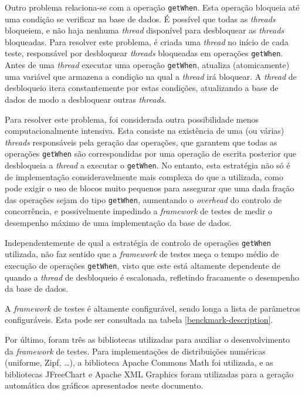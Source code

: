 \documentclass[12pt, a4paper, titlepage]{article}
\begin{document}
Outro problema relaciona-se com a operação \texttt{getWhen}. Esta operação bloqueia até uma condição
se verificar na base de dados. É possível que todas as \emph{threads} bloqueiem, e não haja nenhuma
\emph{thread} disponível para desbloquear as \emph{threads} bloqueadas. Para resolver este problema,
é criada uma \emph{thread} no início de cada teste, responsável por desbloquear \emph{threads}
bloqueadas em operações \texttt{getWhen}. Antes de uma \emph{thread} executar uma operação
\texttt{getWhen}, atualiza (atomicamente) uma variável que armazena a condição na qual a
\emph{thread} irá bloquear. A \emph{thread} de desbloqueio itera constantemente por estas condições,
atualizando a base de dados de modo a desbloquear outras \emph{threads}.

Para resolver este problema, foi considerada outra possibilidade menos computacionalmente intensiva.
Esta consiste na existência de uma (ou várias) \emph{threads} responsáveis pela geração das
operações, que garantem que todas as operações \texttt{getWhen} são correspondidas por uma operação
de escrita posterior que desbloqueia a \emph{thread} a executar o \texttt{getWhen}. No entanto, esta
estratégia não só é de implementação consideravelmente mais complexa do que a utilizada, como pode
exigir o uso de blocos muito pequenos para assegurar que uma dada fração das operações sejam do tipo
\texttt{getWhen}, aumentando o \emph{overhead} do controlo de concorrência, e possivelmente
impedindo a \emph{framework} de testes de medir o desempenho máximo de uma implementação da base de
dados.

Independentemente de qual a estratégia de controlo de operações \texttt{getWhen} utilizada, não faz
sentido que a \emph{framework} de testes meça o tempo médio de execução de operações
\texttt{getWhen}, visto que este está altamente dependente de quando a \emph{thread} de desbloqueio
é escalonada, refletindo fracamente o desempenho da base de dados.

A \emph{framework} de testes é altamente configurável, sendo longa a lista de parâmetros
configuráveis. Esta pode ser consultada na tabela \ref{benckmark-description}.

Por último, foram três as bibliotecas utilizadas para auxiliar o desenvolvimento da \emph{framework}
de testes. Para implementações de distribuições numéricas (uniforme, Zipf, \ldots), a biblioteca
Apache Commons Math \cite{apache-commons-math} foi utilizada, e as bibliotecas JFreeChart
\cite{jfreechart} e Apache XML Graphics \cite{apache-xml-graphics} foram utilizadas para a geração
automática dos gráficos apresentados neste documento.
\end{document}
